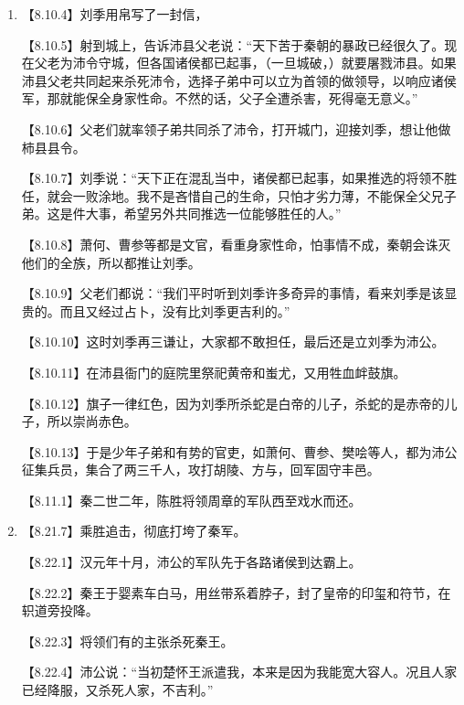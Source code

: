 \documentclass[fontset=none,11pt,a4paper]{ctexart}
\begin{document}
\begin{enumerate}[label=\Alph*.]
\noindent 【8.21.7】乘胜追击，彻底打垮了秦军。\par
\noindent 【8.22.1】汉元年十月，沛公的军队先于各路诸侯到达霸上。\par
  \item
\noindent 【8.10.4】刘季用帛写了一封信，\par
\noindent 【8.10.5】射到城上，告诉沛县父老说：“天下苦于秦朝的暴政已经很久了。现在父老为沛令守城，但各国诸侯都已起事，（一旦城破，）就要屠戮沛县。如果沛县父老共同起来杀死沛令，选择子弟中可以立为首领的做领导，以响应诸侯军，那就能保全身家性命。不然的话，父子全遭杀害，死得毫无意义。”\par
\noindent 【8.10.6】父老们就率领子弟共同杀了沛令，打开城门，迎接刘季，想让他做柿县县令。\par
\noindent 【8.10.7】刘季说：“天下正在混乱当中，诸侯都已起事，如果推选的将领不胜任，就会一败涂地。我不是吝惜自己的生命，只怕才劣力薄，不能保全父兄子弟。这是件大事，希望另外共同推选一位能够胜任的人。”\par
\noindent 【8.10.8】萧何、曹参等都是文官，看重身家性命，怕事情不成，秦朝会诛灭他们的全族，所以都推让刘季。\par
\noindent 【8.10.9】父老们都说：“我们平时听到刘季许多奇异的事情，看来刘季是该显贵的。而且又经过占卜，没有比刘季更吉利的。”\par
\noindent 【8.10.10】这时刘季再三谦让，大家都不敢担任，最后还是立刘季为沛公。\par
\noindent 【8.10.11】在沛县衙门的庭院里祭祀黄帝和蚩尤，又用牲血衅鼓旗。\par
\noindent 【8.10.12】旗子一律红色，因为刘季所杀蛇是白帝的儿子，杀蛇的是赤帝的儿子，所以崇尚赤色。\par
\noindent 【8.10.13】于是少年子弟和有势的官吏，如萧何、曹参、樊哙等人，都为沛公征集兵员，集合了两三千人，攻打胡陵、方与，回军固守丰邑。\par
\noindent 【8.11.1】秦二世二年，陈胜将领周章的军队西至戏水而还。\par
  \item
\noindent 【8.21.7】乘胜追击，彻底打垮了秦军。\par
\noindent 【8.22.1】汉元年十月，沛公的军队先于各路诸侯到达霸上。\par
\noindent 【8.22.2】秦王于婴素车白马，用丝带系着脖子，封了皇帝的印玺和符节，在轵道旁投降。\par
\noindent 【8.22.3】将领们有的主张杀死秦王。\par
\noindent 【8.22.4】沛公说：“当初楚怀王派遣我，本来是因为我能宽大容人。况且人家已经降服，又杀死人家，不吉利。”\par

\end{enumerate}
\end{document}
